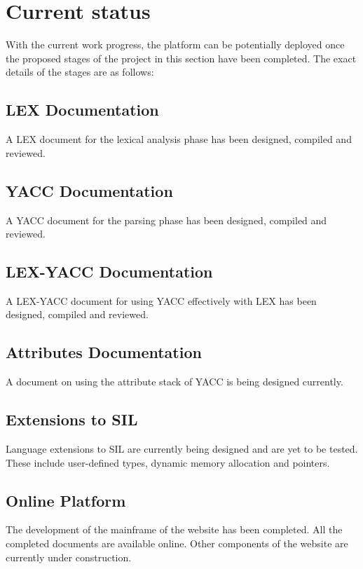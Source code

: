 \chapter{Current status}
With the current work progress, the platform can be potentially deployed once the proposed stages of the project in this section have been completed. The exact details of the stages are as follows: 
\section{LEX Documentation}
A LEX document for the lexical analysis phase has been designed, compiled and reviewed. 
\section{YACC Documentation}
A YACC document for the parsing phase has been designed, compiled and reviewed.
\section{LEX-YACC Documentation}
A LEX-YACC document for using YACC effectively with LEX has been designed, compiled and reviewed.
\section{Attributes Documentation}
A document on using the attribute stack of YACC is being designed currently.  
\section{Extensions to SIL}
Language extensions to SIL are currently being designed and are yet to be tested. These include user-defined types, dynamic memory allocation and pointers.
\section{Online Platform}
The development of the mainframe of the website has been completed. All the completed documents are available online. Other components of the website are currently under construction. 


